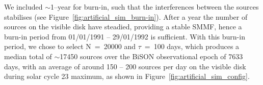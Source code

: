 We included $\sim$1--year for burn-in, such that the interferences between the sources stabilises (see Figure~\ref{fig:artificial_sim_burn-in}). After a year the number of sources on the visible disk have steadied, providing a stable SMMF, hence a burn-in period from 01/01/1991 -- 29/01/1992 is sufficient. With this burn-in period, we chose to select N~=~20000 and $\tau$~=~100 days, which produces a median total of $\sim$17450 sources over the BiSON observational epoch of 7633 days, with an average of around 150 -- 200 sources per day on the visible disk during solar cycle 23 maximum, as shown in Figure~\ref{fig:artificial_sim_config}.


\begin{figure}[!ht]
	\centering
	\qquad
	 \\
	
	\qquad
	
	\qquad
	

\end{figure}
